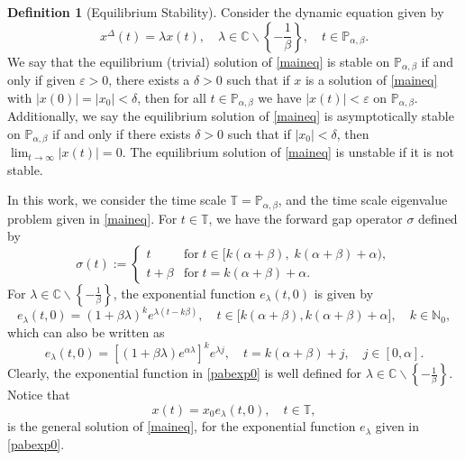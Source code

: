 \documentclass[12pt,reqno]{amsart}
\theoremstyle{plain}
\theoremstyle{definition}
\newtheorem{definition}[theorem]{Definition}
\newcommand{\T}{\ensuremath{\mathbb{T}}}
\newcommand{\N}{\ensuremath{\mathbb{N}}}
\newcommand{\C}{\ensuremath{\mathbb{C}}}
\newcommand{\p}{\ensuremath{\mathbb{P}}}
\numberwithin{equation}{section}
\numberwithin{theorem}{section}
\begin{document}

\begin{definition}[Equilibrium Stability]
Consider the dynamic equation given by
\begin{equation}\label{maineq}
 x^\Delta(t) = \lambda x(t), \quad \lambda\in\C\backslash\left\{-\frac{1}{\beta}\right\}, \quad t\in\p_{\alpha,\beta}.
\end{equation}
We say that the equilibrium (trivial) solution of \eqref{maineq} is stable on $\p_{\alpha,\beta}$ if and only if given $\varepsilon>0$, there exists a $\delta>0$ such that if $x$ is a solution of \eqref{maineq} with $|x(0)|=|x_0|<\delta$, then for all $t\in\p_{\alpha,\beta}$ we have $|x(t)|<\varepsilon$ on $\p_{\alpha,\beta}$. Additionally, we say the equilibrium solution of \eqref{maineq} is asymptotically stable on $\p_{\alpha,\beta}$ if and only if there exists $\delta>0$ such that if $|x_0|<\delta$, then $\displaystyle\lim_{t\rightarrow\infty} |x(t)|=0$. The equilibrium solution of \eqref{maineq} is unstable if it is not stable.
\end{definition}

In this work, we consider the time scale $\T=\p_{\alpha,\beta}$, and the time scale eigenvalue problem given in \eqref{maineq}. For $t\in\T$, we have the forward gap operator $\sigma$ defined by
\[ \sigma(t):=\begin{cases} t&\text{for}\; t\in[k(\alpha+\beta),\;k(\alpha+\beta)+\alpha), \\ t+\beta&\text{for}\; t=k(\alpha+\beta)+\alpha. \end{cases} \]
For $\lambda\in\C\backslash\left\{-\frac{1}{\beta}\right\}$, the exponential function $e_\lambda(t,0)$ is given by
\[
 e_{\lambda}(t,0)=(1+\beta\lambda)^{k}e^{\lambda(t-k\beta)}, \quad t\in\big[k(\alpha+\beta), k(\alpha+\beta)+\alpha\big], \quad k\in\N_{0},
\]
which can also be written as 
\begin{equation}\label{pabexp0} 
 e_{\lambda}(t,0)=\left[(1+\beta\lambda)e^{\alpha\lambda}\right]^{k}e^{\lambda j}, \quad t=k(\alpha+\beta)+j, \quad j\in[0,\alpha]. 
\end{equation}
Clearly, the exponential function in \eqref{pabexp0} is well defined for $\lambda\in\C\backslash\left\{-\frac{1}{\beta}\right\}$. Notice that
\begin{equation}\label{xform}
 x(t)=x_0e_{\lambda}(t,0), \quad t\in\T,
\end{equation}
is the general solution of \eqref{maineq}, for the exponential function $e_{\lambda}$ given in \eqref{pabexp0}.
\end{document}
